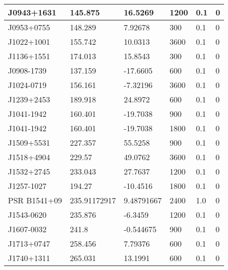 \begin{table}
\begin{tabular}{|l|l|l|l|l|l|}
				J0943+1631
			 & 145.875 & 16.5269 & 1200 & 0.1 & 0 \\ \hline

				J0953+0755
			 & 148.289 & 7.92678 & 300 & 0.1 & 0 \\ \hline

				J1022+1001
			 & 155.742 & 10.0313 & 3600 & 0.1 & 0 \\ \hline

				J1136+1551
			 & 174.013 & 15.8543 & 300 & 0.1 & 0 \\ \hline

				J0908-1739
			 & 137.159 & -17.6605 & 600 & 0.1 & 0 \\ \hline

				J1024-0719
			 & 156.161 & -7.32196 & 3600 & 0.1 & 0 \\ \hline

				J1239+2453
			 & 189.918 & 24.8972 & 600 & 0.1 & 0 \\ \hline

				J1041-1942
			 & 160.401 & -19.7038 & 900 & 0.1 & 0 \\ \hline

				J1041-1942
			 & 160.401 & -19.7038 & 1800 & 0.1 & 0 \\ \hline

				J1509+5531
			 & 227.357 & 55.5258 & 900 & 0.1 & 0 \\ \hline

				J1518+4904
			 & 229.57 & 49.0762 & 3600 & 0.1 & 0 \\ \hline

				J1532+2745
			 & 233.043 & 27.7637 & 1200 & 0.1 & 0 \\ \hline

				J1257-1027
			 & 194.27 & -10.4516 & 1800 & 0.1 & 0 \\ \hline
PSR B1541+09 & 235.91172917 & 9.48791667 & 2400 & 1.0 & 0 \\ \hline

				J1543-0620
			 & 235.876 & -6.3459 & 1200 & 0.1 & 0 \\ \hline

				J1607-0032
			 & 241.8 & -0.544675 & 900 & 0.1 & 0 \\ \hline

				J1713+0747
			 & 258.456 & 7.79376 & 600 & 0.1 & 0 \\ \hline

				J1740+1311
			 & 265.031 & 13.1991 & 600 & 0.1 & 0 \\ \hline


\end{tabular}
\end{table}
